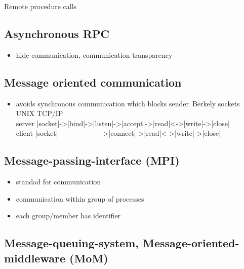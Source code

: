 \documentclass[ngerman,a4paper]{report}
\begin{document}
Remote procedure calls\\
\subsection{Asynchronous RPC}

\begin{itemize}
	\item hide communication, communication transparency
\end{itemize}

\subsection{Message oriented communication\\}
\begin{itemize}
	\item avoids synchronous communication which blocks sender\
	Berkely sockets UNIX TCP/IP\\
	server |socket|->|bind|->|listen|->|accept|->|read|<->|write|->|close|\\
	client |socket|------------------->|connect|->|read|<->|write|->|close|\\

\end{itemize}

\subsection{Message-passing-interface (MPI)\\}
\begin{itemize}
	\item standad for communication
	\item communication within group of processes
	\item each group/member has identifier
\end{itemize}

\subsection{Message-queuing-system, Message-oriented-middleware (MoM)}
\end{document}
